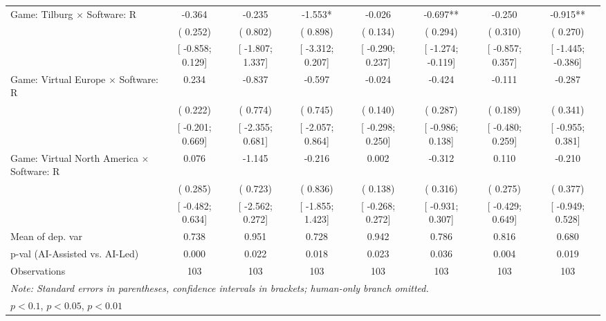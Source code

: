 \begin{tabular}{l*{7}{c}}
Game: Tilburg $\times$ Software: R &   -0.364   &   -0.235   &   -1.553*   &   -0.026   &   -0.697**   &   -0.250   &   -0.915**   \\
                    &(    0.252)   &(    0.802)   &(    0.898)   &(    0.134)   &(    0.294)   &(    0.310)   &(    0.270)   \\
                    &[   -0.858;     0.129]   &[   -1.807;     1.337]   &[   -3.312;     0.207]   &[   -0.290;     0.237]   &[   -1.274;    -0.119]   &[   -0.857;     0.357]   &[   -1.445;    -0.386]   \\
Game: Virtual Europe $\times$ Software: R &    0.234   &   -0.837   &   -0.597   &   -0.024   &   -0.424   &   -0.111   &   -0.287   \\
                    &(    0.222)   &(    0.774)   &(    0.745)   &(    0.140)   &(    0.287)   &(    0.189)   &(    0.341)   \\
                    &[   -0.201;     0.669]   &[   -2.355;     0.681]   &[   -2.057;     0.864]   &[   -0.298;     0.250]   &[   -0.986;     0.138]   &[   -0.480;     0.259]   &[   -0.955;     0.381]   \\
Game: Virtual North America $\times$ Software: R &    0.076   &   -1.145   &   -0.216   &    0.002   &   -0.312   &    0.110   &   -0.210   \\
                    &(    0.285)   &(    0.723)   &(    0.836)   &(    0.138)   &(    0.316)   &(    0.275)   &(    0.377)   \\
                    &[   -0.482;     0.634]   &[   -2.562;     0.272]   &[   -1.855;     1.423]   &[   -0.268;     0.272]   &[   -0.931;     0.307]   &[   -0.429;     0.649]   &[   -0.949;     0.528]   \\
\hline
Mean of dep. var    &    0.738   &    0.951   &    0.728   &    0.942   &    0.786   &    0.816   &    0.680   \\
p-val (AI-Assisted vs. AI-Led)&    0.000   &    0.022   &    0.018   &    0.023   &    0.036   &    0.004   &    0.019   \\
Observations        &103   &103   &103   &103   &103   &103   &103   \\
\hline\hline
\multicolumn{8}{l}{\it{Note:} Standard errors in parentheses, confidence intervals in brackets; human-only branch omitted.}\\
\multicolumn{8}{l}{\sym{*} \(p<0.1\), \sym{**} \(p<0.05\), \sym{***} \(p<0.01\)}\\
\end{tabular}
